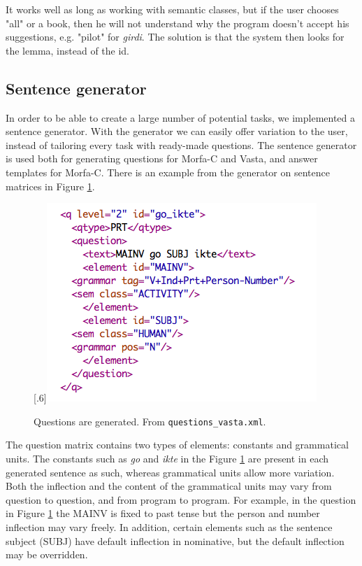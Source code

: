 \documentclass[a4paper,12pt]{article}
\begin{document}
It works well as long as working with semantic classes, but if the user chooses "all" or a book, then he will not understand why the program doesn't accept his suggestions, e.g. "pilot" for \textit{girdi}. The solution is that the system then looks for the lemma, instead of the id.

\subsection{Sentence generator}\label{set}
In order to be able to create a large number of potential tasks, we implemented a sentence generator. With the generator we can easily offer variation to the user, instead of tailoring every task with ready-made questions. The sentence generator is used both for generating questions for Morfa-C and Vasta, and answer templates for Morfa-C. There is an example from the generator on sentence matrices in Figure \ref{questionv}.
\begin{figure}[htbp]
\begin{center}
\scalebox{.6}[.6]{\includegraphics{img/question_vasta.png}}\\
\caption{Questions are generated. From \texttt{questions\_vasta.xml}.}
\label{questionv}
\end{center}
\end{figure}

The question matrix contains two types of elements: constants and grammatical units. The constants such as \textit{go} and \textit{ikte} in the Figure \ref{questionv} are present in each generated sentence as such, whereas grammatical units allow more variation. Both the inflection and the content of the grammatical units may vary from question to question, and from program to program. For example, in the question in Figure \ref{questionv} the MAINV is fixed to past tense but the person and number inflection may vary freely. In addition, certain elements such as the sentence subject (SUBJ) have default inflection in nominative, but the default inflection may be overridden. 
\end{document}
